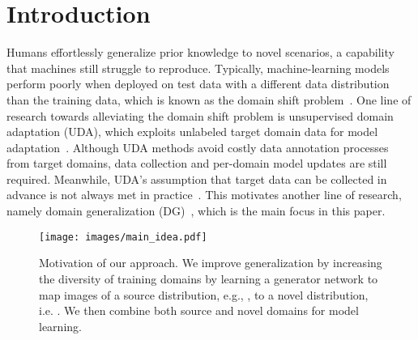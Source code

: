 \documentclass[runningheads]{llncs}
\begin{document}
\section{Introduction} \label{sec:intro}
Humans effortlessly generalize prior knowledge to novel scenarios, a capability that machines still struggle to reproduce. Typically, machine-learning models perform poorly when deployed on test data with a different data distribution than the training data, which is known as the domain shift problem~\cite{zhou2021domain,moreno2012unifying}. One line of research towards alleviating the domain shift problem is unsupervised domain adaptation (UDA), which exploits unlabeled target domain data for model adaptation~\cite{ganin2015unsupervised,long2015learning,hoffman2018cycada,Peng_2019_ICCV,Xu_2019_ICCV,Saito_2019_ICCV}. Although UDA methods avoid costly data annotation processes from target domains, data collection and per-domain model updates are still required. Meanwhile, UDA's assumption that target data can be collected in advance is not always met in practice~\cite{muandet2013domain,dou2019domain}. This motivates another line of research, namely domain generalization (DG)~\cite{zhou2021domain,muandet2013domain,ghifary2015domain,ghifary2017scatter,balaji2018metareg,cvpr19JiGen,dou2019domain}, which is the main focus in this paper.

\begin{figure}[t]
    \centering
    \texttt{[image: images/main\_idea.pdf]}
    \caption{Motivation of our approach. We improve generalization by increasing the diversity of training domains by learning a generator network  to map images of a source distribution, e.g., , to a novel distribution, i.e. . We then combine both source and novel domains for model learning.}
    \label{fig:main_idea}
\end{figure}
\end{document}
